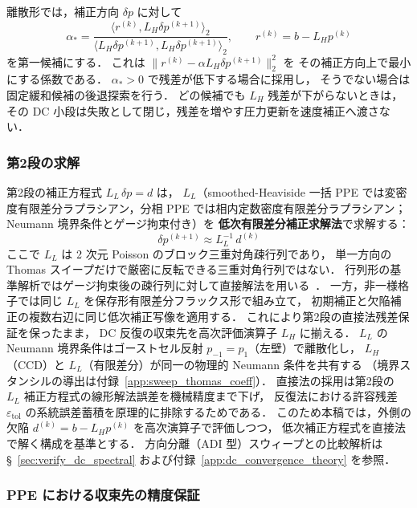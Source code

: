 離散形では，補正方向 $\delta p$ に対して
\begin{equation}
  \alpha_\ast
  =
  \frac{\langle r^{(k)}, L_H\delta p^{(k+1)}\rangle_2}
       {\langle L_H\delta p^{(k+1)}, L_H\delta p^{(k+1)}\rangle_2},
  \qquad
  r^{(k)}=b-L_Hp^{(k)}
  \label{eq:ppe_dc_residual_minimizing_alpha}
\end{equation}
を第一候補にする．
これは $\|r^{(k)}-\alpha L_H\delta p^{(k+1)}\|_2^2$ を
その補正方向上で最小にする係数である．
$\alpha_\ast>0$ で残差が低下する場合に採用し，
そうでない場合は固定緩和候補の後退探索を行う．
どの候補でも $L_H$ 残差が下がらないときは，
その DC 小段は失敗として閉じ，残差を増やす圧力更新を速度補正へ渡さない．

\subsubsection{第2段の求解}
\label{sec:dc_sweep}

第2段の補正方程式 $L_L\,\delta p = d$ は，
$L_L$（smoothed-Heaviside 一括 PPE では変密度有限差分ラプラシアン，分相 PPE では相内定数密度有限差分ラプラシアン；
Neumann 境界条件とゲージ拘束付き）を
\textbf{低次有限差分補正求解法}で求解する：
\begin{equation}
  \delta p^{(k+1)} \approx L_L^{-1}\,d^{(k)}
  \label{eq:dc_step2_lu}
\end{equation}
ここで $L_L$ は 2 次元 Poisson のブロック三重対角疎行列であり，
単一方向の Thomas スイープだけで厳密に反転できる三重対角行列ではない．
行列形の基準解析ではゲージ拘束後の疎行列に対して直接解法を用いる~\cite{Kelley2003}．
一方，非一様格子では同じ $L_L$ を保存形有限差分フラックス形で組み立て，
初期補正と欠陥補正の複数右辺に同じ低次補正写像を適用する．
これにより第2段の直接法残差保証を保ったまま，
DC 反復の収束先を高次評価演算子 $L_H$ に揃える．
$L_L$ の Neumann 境界条件はゴーストセル反射 $p_{-1}=p_1$（左壁）で離散化し，
$L_H$（CCD）と $L_L$（有限差分）が同一の物理的 Neumann 条件を共有する
（境界スタンシルの導出は付録~\ref{app:sweep_thomas_coeff}）．
直接法の採用は第2段の $L_L$ 補正方程式の線形解法誤差を機械精度まで下げ，
反復法における許容残差 $\varepsilon_\mathrm{tol}$ の系統誤差蓄積を原理的に排除するためである．
このため本稿では，外側の欠陥 $d^{(k)}=b-L_Hp^{(k)}$ を高次演算子で評価しつつ，
低次補正方程式を直接法で解く構成を基準とする．
方向分離（ADI 型）スウィープとの比較解析は §~\ref{sec:verify_dc_spectral} および付録~\ref{app:dc_convergence_theory} を参照．

\subsubsection{PPE における収束先の精度保証}
\label{sec:ppe_dc_accuracy}

